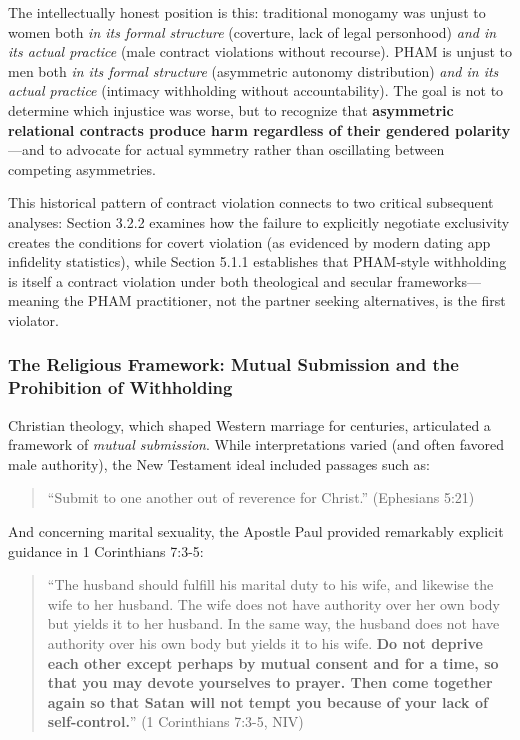 \documentclass[12pt, letterpaper]{article}
\begin{document}
The intellectually honest position is this: traditional monogamy was unjust to women both \textit{in its formal structure} (coverture, lack of legal personhood) \textit{and in its actual practice} (male contract violations without recourse). PHAM is unjust to men both \textit{in its formal structure} (asymmetric autonomy distribution) \textit{and in its actual practice} (intimacy withholding without accountability). The goal is not to determine which injustice was worse, but to recognize that \textbf{asymmetric relational contracts produce harm regardless of their gendered polarity}---and to advocate for actual symmetry rather than oscillating between competing asymmetries.

This historical pattern of contract violation connects to two critical subsequent analyses: Section 3.2.2 examines how the failure to explicitly negotiate exclusivity creates the conditions for covert violation (as evidenced by modern dating app infidelity statistics), while Section 5.1.1 establishes that PHAM-style withholding is itself a contract violation under both theological and secular frameworks---meaning the PHAM practitioner, not the partner seeking alternatives, is the first violator.

\subsubsection{The Religious Framework: Mutual Submission and the Prohibition of Withholding}

Christian theology, which shaped Western marriage for centuries, articulated a framework of \textit{mutual submission}. While interpretations varied (and often favored male authority), the New Testament ideal included passages such as:

\begin{quote}
    ``Submit to one another out of reverence for Christ.'' (Ephesians 5:21)
\end{quote}

And concerning marital sexuality, the Apostle Paul provided remarkably explicit guidance in 1 Corinthians 7:3-5:

\begin{quote}
    ``The husband should fulfill his marital duty to his wife, and likewise the wife to her husband. The wife does not have authority over her own body but yields it to her husband. In the same way, the husband does not have authority over his own body but yields it to his wife. \textbf{Do not deprive each other except perhaps by mutual consent and for a time, so that you may devote yourselves to prayer. Then come together again so that Satan will not tempt you because of your lack of self-control.}'' (1 Corinthians 7:3-5, NIV)
\end{quote}
\end{document}
